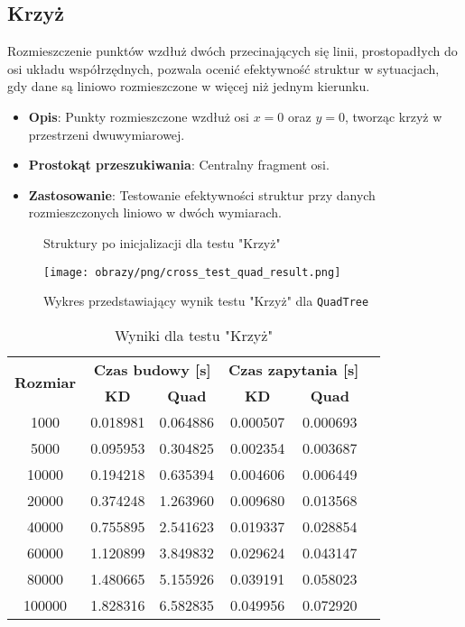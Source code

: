 \documentclass[12pt]{article}
\begin{document}
\subsection{Krzyż}
Rozmieszczenie punktów wzdłuż dwóch przecinających się linii, prostopadłych do osi układu współrzędnych, pozwala ocenić efektywność struktur w sytuacjach, gdy dane są liniowo rozmieszczone w więcej niż jednym kierunku.
\begin{itemize}
    \item \textbf{Opis}: Punkty rozmieszczone wzdłuż osi \( x = 0 \) oraz \( y = 0 \), tworząc krzyż w przestrzeni dwuwymiarowej.
    \item \textbf{Prostokąt przeszukiwania}: Centralny fragment osi.
    \item \textbf{Zastosowanie}: Testowanie efektywności struktur przy danych rozmieszczonych liniowo w dwóch wymiarach.
\end{itemize}

\begin{figure}[h]
    \centering
    \qquad
    \caption{Struktury po inicjalizacji dla testu "Krzyż"}%
    \label{fig:cross}%
\end{figure}

\begin{figure}[h]
    \centering
    \texttt{[image: obrazy/png/cross\_test\_quad\_result.png]}
    \caption{Wykres przedstawiający wynik testu "Krzyż" dla \texttt{QuadTree}}
    \label{fig:cross_test_quad_result}
\end{figure}

\begin{table}[h]
\centering
\caption{Wyniki dla testu "Krzyż"}
\label{tab:cross_test}
\begin{tabular}{cccccc}
\toprule
\multirow{2}{*}{\textbf{Rozmiar}} & \multicolumn{2}{c}{\textbf{Czas budowy [s]}} & \multicolumn{2}{c}{\textbf{Czas zapytania [s]}} \\
\cmidrule(lr){2-3} \cmidrule(lr){4-5}
 & \textbf{KD} & \textbf{Quad} & \textbf{KD} & \textbf{Quad} \\
\midrule
1000   & 0.018981 & 0.064886 & 0.000507 & 0.000693 \\
5000   & 0.095953 & 0.304825 & 0.002354 & 0.003687 \\
10000  & 0.194218 & 0.635394 & 0.004606 & 0.006449 \\
20000  & 0.374248 & 1.263960 & 0.009680 & 0.013568 \\
40000  & 0.755895 & 2.541623 & 0.019337 & 0.028854 \\
60000  & 1.120899 & 3.849832 & 0.029624 & 0.043147 \\
80000  & 1.480665 & 5.155926 & 0.039191 & 0.058023 \\
100000 & 1.828316 & 6.582835 & 0.049956 & 0.072920 \\
\bottomrule
\end{tabular}
\end{table}
\end{document}
